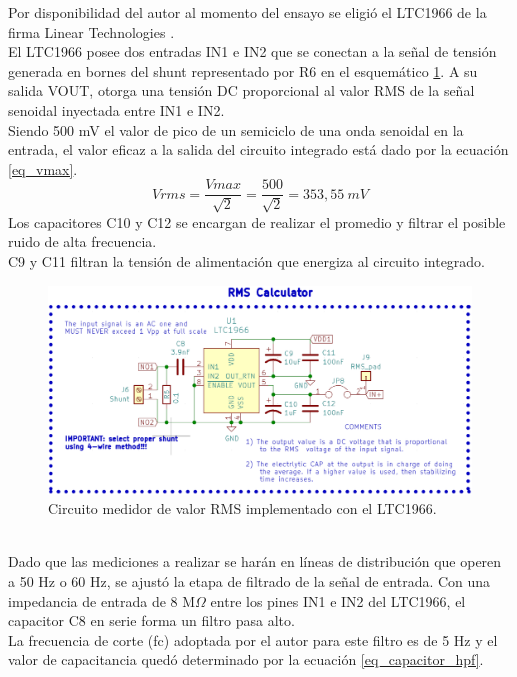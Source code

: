 Por disponibilidad del autor al momento del ensayo se eligió el LTC1966 de la firma Linear Technologies \citep{ad636}.\\
El LTC1966 posee dos entradas IN1 e IN2 que se conectan a la señal de tensión generada en bornes del shunt representado por R6 en el esquemático \ref{fig:ctomedidorrms}. A su salida VOUT, otorga una tensión DC proporcional al valor RMS de la señal senoidal inyectada entre IN1 e IN2.\\
Siendo 500 mV el valor de pico de un semiciclo de una onda senoidal en la entrada, el valor eficaz a la salida del circuito integrado est\'{a} dado por la ecuación \ref{eq_vmax}.
\begin{equation}
	\label{eq_vmax}
	Vrms=\frac{Vmax}{\sqrt{2}}=\frac{500}{\sqrt{2}}= 353,55\  mV
\end{equation}
Los capacitores C10 y C12 se encargan de realizar el promedio y filtrar el posible ruido de alta frecuencia.\\
C9 y C11 filtran la tensión de alimentación que energiza al circuito integrado.\\
\begin{figure}[h!]
	\centering
	\includegraphics[width=1.0\linewidth]{Figures/cto_medidor_rms}
	\caption{Circuito medidor de valor RMS implementado con el LTC1966.}
	\label{fig:ctomedidorrms}
\end{figure}\\
Dado que las mediciones a realizar se harán en líneas de distribución que operen a 50 Hz o 60 Hz, se ajustó la etapa de filtrado de la señal de entrada. Con una impedancia de entrada de 8 M$\Omega$ entre los pines IN1 e IN2 del LTC1966, el capacitor C8 en serie forma un filtro pasa alto.\\
La frecuencia de corte (fc) adoptada por el autor para este filtro es de 5 Hz y el valor de capacitancia quedó determinado por la ecuación \ref{eq_capacitor_hpf}.
